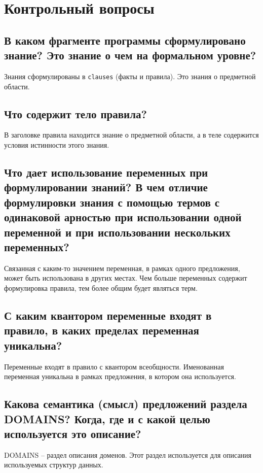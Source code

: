 \chapter{Контрольный вопросы}

\section{В каком фрагменте программы сформулировано знание? Это знание о чем на формальном уровне?}

Знания сформулированы в \texttt{clauses} (факты и правила). Это знания о предметной
области.

\section{Что содержит тело правила?}

В заголовке правила находится знание о предметной области, а в теле
содержится условия истинности этого знания.

\section{Что дает использование переменных при формулировании знаний? В чем отличие формулировки знания с помощью термов с одинаковой арностью при использовании одной переменной и при использовании нескольких
переменных?}

Связанная с каким-то значением переменная, в рамках одного предложения,
может быть использована в других местах.
Чем больше переменных содержит формулировка правила, тем более общим
будет являться терм.

\section{С каким квантором переменные входят в правило, в каких пределах переменная уникальна?}

Переменные входят в правило с квантором всеобщности. Именованная
переменная уникальна в рамках предложения, в котором она используется.

\section{Какова семантика (смысл) предложений раздела DOMAINS? Когда, где и с какой целью используется это описание?}

DOMAINS -- раздел описания доменов. Этот раздел используется для описания
используемых структур данных.

